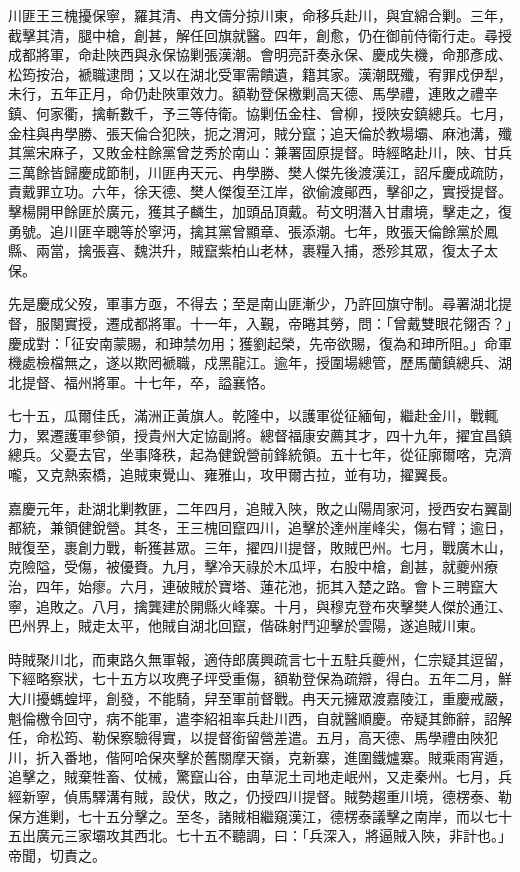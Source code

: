 \begin{pinyinscope}
川匪王三槐擾保寧，羅其清、冉文儔分掠川東，命移兵赴川，與宜綿合剿。三年，截擊其清，腿中槍，創甚，解任回旗就醫。四年，創愈，仍在御前侍衛行走。尋授成都將軍，命赴陜西與永保協剿張漢潮。會明亮訐奏永保、慶成失機，命那彥成、松筠按治，褫職逮問；又以在湖北受軍需饋遺，籍其家。漢潮既殲，宥罪戍伊犁，未行，五年正月，命仍赴陜軍效力。額勒登保檄剿高天德、馬學禮，連敗之禮辛鎮、何家衢，擒斬數千，予三等侍衛。協剿伍金柱、曾柳，授陜安鎮總兵。七月，金柱與冉學勝、張天倫合犯陜，扼之渭河，賊分竄；追天倫於教場壩、麻池溝，殲其黨宋麻子，又敗金柱餘黨曾芝秀於南山：兼署固原提督。時經略赴川，陜、甘兵三萬餘皆歸慶成節制，川匪冉天元、冉學勝、樊人傑先後渡漢江，詔斥慶成疏防，責戴罪立功。六年，徐天德、樊人傑復至江岸，欲偷渡鄖西，擊卻之，實授提督。擊楊開甲餘匪於廣元，獲其子麟生，加頭品頂戴。茍文明潛入甘肅境，擊走之，復勇號。追川匪辛聰等於寧沔，擒其黨曾顯章、張添潮。七年，敗張天倫餘黨於鳳縣、兩當，擒張喜、魏洪升，賊竄紫柏山老林，裹糧入捕，悉殄其眾，復太子太保。

先是慶成父歿，軍事方亟，不得去；至是南山匪漸少，乃許回旗守制。尋署湖北提督，服闋實授，遷成都將軍。十一年，入覲，帝睠其勞，問：「曾戴雙眼花翎否？」慶成對：「征安南蒙賜，和珅禁勿用；獲劉起榮，先帝欲賜，復為和珅所阻。」命軍機處檢檔無之，遂以欺罔褫職，戍黑龍江。逾年，授圍場總管，歷馬蘭鎮總兵、湖北提督、福州將軍。十七年，卒，謚襄恪。

七十五，瓜爾佳氏，滿洲正黃旗人。乾隆中，以護軍從征緬甸，繼赴金川，戰輒力，累遷護軍參領，授貴州大定協副將。總督福康安薦其才，四十九年，擢宜昌鎮總兵。父憂去官，坐事降秩，起為健銳營前鋒統領。五十七年，從征廓爾喀，克濟嚨，又克熱索橋，追賊東覺山、雍雅山，攻甲爾古拉，並有功，擢翼長。

嘉慶元年，赴湖北剿教匪，二年四月，追賊入陜，敗之山陽周家河，授西安右翼副都統，兼領健銳營。其冬，王三槐回竄四川，追擊於達州崖峰尖，傷右臂；逾日，賊復至，裹創力戰，斬獲甚眾。三年，擢四川提督，敗賊巴州。七月，戰廣木山，克險隘，受傷，被優賚。九月，擊冷天祿於木瓜坪，右股中槍，創甚，就夔州療治，四年，始瘳。六月，連破賊於寶塔、蓮花池，扼其入楚之路。會卜三聘竄大寧，追敗之。八月，擒龔建於開縣火峰寨。十月，與穆克登布夾擊樊人傑於通江、巴州界上，賊走太平，他賊自湖北回竄，偕硃射鬥迎擊於雲陽，遂追賊川東。

時賊聚川北，而東路久無軍報，適侍郎廣興疏言七十五駐兵夔州，仁宗疑其逗留，下經略察狀，七十五方以攻麂子坪受重傷，額勒登保為疏辯，得白。五年二月，鮮大川擾螞蝗坪，創發，不能騎，舁至軍前督戰。冉天元擁眾渡嘉陵江，重慶戒嚴，魁倫檄令回守，病不能軍，遣李紹祖率兵赴川西，自就醫順慶。帝疑其飾辭，詔解任，命松筠、勒保察驗得實，以提督銜留營差遣。五月，高天德、馬學禮由陜犯川，折入番地，偕阿哈保夾擊於舊關摩天嶺，克新寨，進圍鐵爐寨。賊乘雨宵遁，追擊之，賊棄牲畜、仗械，驚竄山谷，由草泥土司地走岷州，又走秦州。七月，兵經新寧，偵馬驛溝有賊，設伏，敗之，仍授四川提督。賊勢趨重川境，德楞泰、勒保方進剿，七十五分擊之。至冬，諸賊相繼窺漢江，德楞泰議擊之南岸，而以七十五出廣元三家壩攻其西北。七十五不聽調，曰：「兵深入，將逼賊入陜，非計也。」帝聞，切責之。


\end{pinyinscope}
